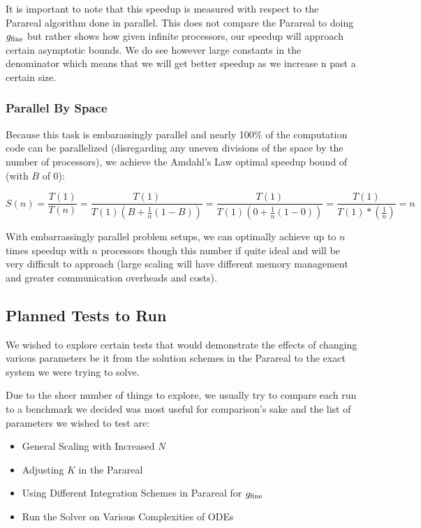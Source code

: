 \documentclass[letterpaper,12pt]{article}
\begin{document}
It is important to note that this speedup is measured with respect to the Parareal algorithm done in parallel. This does not compare the Parareal to doing $g_{\textnormal{fine}}$ but rather shows how given infinite processors, our speedup will approach certain asymptotic bounds. We do see however large constants in the denominator which means that we will get better speedup as we increase n past a certain size.

\subsubsection{Parallel By Space}

Because this task is embarassingly parallel and nearly 100\% of the computation code can be parallelized (disregarding any uneven divisions of the space by the number of processors), we achieve the Amdahl's Law optimal speedup bound of (with $B$ of 0):

\[
S(n) = \frac{T(1)}{T(n)} = \frac{T(1)}{ T(1) \left( B + \frac{1}{n} (1-B) \right)} = \frac{T(1)}{T(1) \left( 0 + \frac{1}{n} (1-0) \right)} = \frac{T(1)}{T(1) * \left( \frac{1}{n} \right) } = n
\]

With embarrassingly parallel problem setups, we can optimally achieve up to $n$ times speedup with $n$ processors though this number if quite ideal and will be very difficult to approach (large scaling will have different memory management and greater communication overheads and costs).

\subsection{Planned Tests to Run}

We wished to explore certain tests that would demonstrate the effects of changing various parameters be it from the solution schemes in the Parareal to the exact system we were trying to solve.

Due to the sheer number of things to explore, we usually try to compare each run to a benchmark we decided was most useful for comparison's sake and the list of parameters we wished to test are:

\begin{itemize}
\item General Scaling with Increased $N$
\item Adjusting $K$ in the Parareal
\item Using Different Integration Schemes in Parareal for $g_{\textnormal{fine}}$
\item Run the Solver on Various Complexities of ODEs
\end{itemize}
\end{document}
